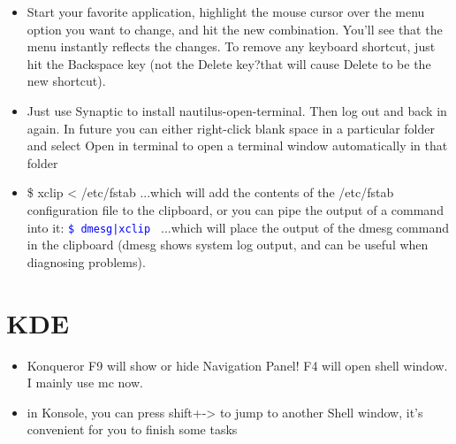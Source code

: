 \documentclass[a4paper,12pt,twoside]{book}
\newcommand{\linuxcommand}[1]{\texttt{\textcolor{blue}{\$ #1 \Pisymbol{psy}{191}}}}
\begin{document}
\begin{CJK*}{UTF8}{song}
\begin{itemize}
		\item Start your favorite application, highlight the mouse cursor over the menu option you want to change, and hit the new
		combination. You'll see that the menu instantly reflects the changes. To remove any keyboard shortcut, just hit the Backspace key
		(not the Delete key?that will cause Delete to be the new shortcut).
		\item Just use Synaptic to install nautilus-open-terminal. Then log out and back in again. In future you can either right-click blank
		space in a particular folder and select Open in terminal to open a terminal window automatically in that folder
		\item \$ xclip < /etc/fstab
		...which will add the contents of the /etc/fstab configuration file to the clipboard, or you can pipe the output of a command into it:
		\linuxcommand{dmesg|xclip}
		...which will place the output of the dmesg command in the clipboard (dmesg shows system log output, and can be useful when diagnosing problems).
	\end{itemize}

\section{KDE}
		\begin{itemize}
		\item Konqueror F9 will show or hide Navigation Panel! F4 will open shell window. I mainly use mc now.
		\item in Konsole, you can press shift+-> to jump to another Shell window, it's convenient for you to finish some tasks
		\end{itemize}

\ifx \allfiles \undefined
\end{CJK*}
\end{document}
